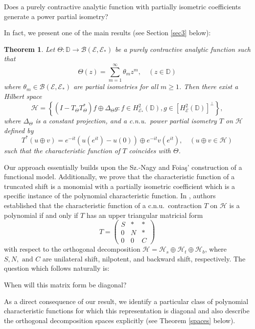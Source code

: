 \documentclass[12pt]{amsart}
\newcommand{\clb}{\mathcal{B}}
\newcommand{\clh}{\mathcal{H}}
\newcommand{\D}{\mathbb{D}}
\newcommand{\E}{\mathcal{E}}
\newcommand{\he}{{H}^2_\mathcal{E}(\mathbb{D})}
\theoremstyle{definition}
\theoremstyle{plain}
\newtheorem{thm}{Theorem}[section]
\theoremstyle{definition}
\numberwithin{equation}{section}
\begin{document}
\textsf{Does a purely contractive analytic function with partially isometric coefficients generate a power partial isometry?}

In fact, we present one of the main results (see Section \ref{sec3} below):

\begin{thm}
Let $\Theta : \D \rightarrow \clb(\E,\E_*)$ be a purely contractive analytic function such that 
\[
\Theta( z)=\sum_{m=1}^\infty  \theta_mz^m, \quad (z\in \D)
\]
where $\theta_m \in \mathcal{B}(\E,\E_*)$ are partial isometries for all $m \geq 1$. Then there exist a Hilbert space 
\[
\clh=\left\{\left(I-T_\Theta T_\Theta^* \right)f\oplus \Delta_\Theta g: f \in H^2_{\E_*}(\D), g \in [\he]^\perp\right\},
\]
where $\Delta_\Theta$ is a constant projection, and a c.n.u.\ power partial isometry $T$ on $\clh$ defined by
\[
T^*(u \oplus v) = e^{-it}(u(e^{it}) - u(0)) \oplus e^{-it} v(e^{it}), \quad (u \oplus v \in \clh)
\]
such that the characteristic function of $T$ coincides with $\Theta$.
\end{thm}


Our approach essentially builds upon the Sz.-Nagy and Foia\c{s}' construction of a functional model. Additionally, we prove that the characteristic function of a truncated shift is a monomial with a partially isometric coefficient which is a specific instance of the polynomial characteristic function. In \cite{foias}, authors established that the characteristic function of a c.n.u.\ contraction $T$ on $\clh$ is a polynomial if and only if $T$ has an upper triangular matricial form
\[
T=\begin{pmatrix}
S & * & *\\
0 & N & *\\
0 & 0 & C
\end{pmatrix}
\]
with respect to the orthogonal decomposition $\clh=\clh_s \oplus \clh_t \oplus \clh_b$, where $S, N, \text{ and  }C$ are unilateral shift, nilpotent, and backward shift, respectively. The question which follows naturally is: 
\vspace{-0.4 cm}
\begin{center}
\textsf{When will this matrix form be diagonal?} 
\end{center}
As a direct consequence of our result, we identify a particular class of polynomial characteristic functions for which this representation is diagonal and also describe the orthogonal decomposition spaces explicitly (see Theorem \ref{spaces} below).
\end{document}

